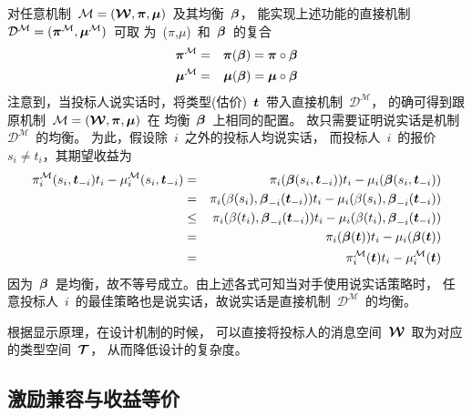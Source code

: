 \documentclass[a4paper,12pt]{article}
\newcommand{\mv}[1]{\mbox{\boldmath$#1$}}         %
\begin{document}
对任意机制~$\mathcal{M}=(\mv{\mathcal{W}},\mv{\pi},\mv{\mu})$~及其均衡~$\mv{\beta}$，
能实现上述功能的直接机制~$\mathcal{D}^\mathcal{M}=(\mv{\pi}^\mathcal{M},\mv{\mu}^\mathcal{M})$~可取
为~(\mv{\pi},\mv{\mu})~和~$\mv{\beta}$~的复合
 \begin{eqnarray*}
  \mv{\pi}^\mathcal{M} &=& \mv{\pi}(\mv{\beta})=\mv{\pi}\circ\mv{\beta} \\
  \mv{\mu}^\mathcal{M} &=& \mv{\mu}(\mv{\beta})=\mv{\mu}\circ\mv{\beta}
\end{eqnarray*}
注意到，当投标人说实话时，将类型(估价)~$\mv{t}$~带入直接机制~$\mathcal{D}^\mathcal{M}$，
的确可得到跟原机制~$\mathcal{M}=(\mv{\mathcal{W}},\mv{\pi},\mv{\mu})$~在
均衡~$\mv{\beta}$~上相同的配置。
故只需要证明说实话是机制~$\mathcal{D}^\mathcal{M}$~的均衡。
为此，假设除~$i$~之外的投标人均说实话，
而投标人~$i$~的报价~$s_i \neq t_i$，其期望收益为
\begin{eqnarray*}
  \pi^\mathcal{M}_i(s_i,\mv{t}_{-i})t_i - \mu_i^\mathcal{M}(s_i,\mv{t}_{-i}) &=&
   \pi_i(\mv{\beta}(s_i,\mv{t}_{-i}))t_i - \mu_i(\mv{\beta}(s_i,\mv{t}_{-i}))\\
   &=& \pi_i(\beta(s_i),\mv{\beta}_{-i}(\mv{t}_{-i}))t_i - \mu_i(\beta(s_i),\mv{\beta}_{-i}(\mv{t}_{-i}))\\
   &\leq& \pi_i(\beta(t_i),\mv{\beta}_{-i}(\mv{t}_{-i}))t_i - \mu_i(\beta(t_i),\mv{\beta}_{-i}(\mv{t}_{-i}))\\
   &=& \pi_i(\mv{\beta}(\mv{t}))t_i - \mu_i(\mv{\beta}(\mv{t}))\\
   &=& \pi^\mathcal{M}_i(\mv{t})t_i - \mu_i^\mathcal{M}(\mv{t})
\end{eqnarray*}
因为~$\mv{\beta}$~是均衡，故不等号成立。由上述各式可知当对手使用说实话策略时，
任意投标人~$i$~的最佳策略也是说实话，故说实话是直接机制~$\mathcal{D}^\mathcal{M}$~的均衡。

根据显示原理，在设计机制的时候，
可以直接将投标人的消息空间~$\mv{\mathcal{W}}$~取为对应的类型空间~$\mv{\mathcal{T}}$，
从而降低设计的复杂度。


 \subsection{激励兼容与收益等价}\label{sec:survey:incentive:IC}
\end{document}
